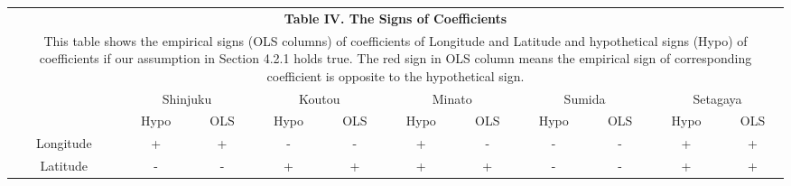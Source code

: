 \documentclass[a4paper, 12pt]{article} %
\begin{document}
\begin{table}[!htbp] \centering 
\label{tb4}
\begin{tabular}{ccccccccccc}
\multicolumn{11}{c}{\textbf{Table IV. The Signs of Coefficients}} \\
\multicolumn{11}{p{14.5cm}}{This table shows the empirical signs (OLS columns) of coefficients of Longitude and Latitude and hypothetical signs (Hypo) of coefficients if our assumption in Section 4.2.1 holds true. The red sign in OLS column means the empirical sign of corresponding coefficient is opposite to the hypothetical sign.} \\
\hline
& \multicolumn{2}{c}{Shinjuku} & \multicolumn{2}{c}{Koutou} & \multicolumn{2}{c}{Minato} & \multicolumn{2}{c}{Sumida} & \multicolumn{2}{c}{Setagaya} \\
\hline
& Hypo & OLS & Hypo & OLS & Hypo & OLS& Hypo & OLS& Hypo & OLS \\
Longitude & + & + & - & - & + & {\color{red}-} & - & - & + & + \\
Latitude & - & - & + & + & + & + & - & - & + & + \\
 \hline
\end{tabular}
\end{table}
\end{document}

